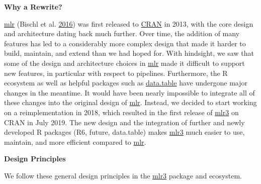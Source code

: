 \documentclass[]{article}
\begin{document}
\textbf{Why a Rewrite?}

\href{https://mlr.mlr-org.com}{mlr} (Bischl et al. \protect\hyperlink{ref-mlr}{2016}) was first released to \href{https://cran.r-project.org}{CRAN} in 2013, with the core design and architecture dating back much further.
Over time, the addition of many features has led to a considerably more complex design that made it harder to build, maintain, and extend than we had hoped for.
With hindsight, we saw that some of the design and architecture choices in \href{https://mlr.mlr-org.com}{mlr} made it difficult to support new features, in particular with respect to pipelines.
Furthermore, the R ecosystem as well as helpful packages such as \href{https://cran.r-project.org/package=data.table}{data.table} have undergone major changes in the meantime.
It would have been nearly impossible to integrate all of these changes into the original design of \href{https://mlr.mlr-org.com}{mlr}.
Instead, we decided to start working on a reimplementation in 2018, which resulted in the first release of \href{https://mlr3.mlr-org.com}{mlr3} on CRAN in July 2019.
The new design and the integration of further and newly developed R packages (R6, future, data.table) makes \href{https://mlr3.mlr-org.com}{mlr3} much easier to use, maintain, and more efficient compared to \href{https://mlr.mlr-org.com}{mlr}.

\textbf{Design Principles}

We follow these general design principles in the \href{https://mlr3.mlr-org.com}{mlr3} package and ecosystem.
\end{document}
